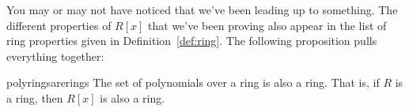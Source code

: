 


You may or may not have noticed that we've been leading up to something. The different properties of $R[x]$  that we've been proving also appear in the list of ring properties given in Definition~\ref{def:ring}. The following proposition pulls everything together:

\begin{prop}{polyringsarerings} The set of polynomials over a ring is also a ring. That is, if $R$ is a ring, then $R[x]$ is also a ring.
\end{prop}

